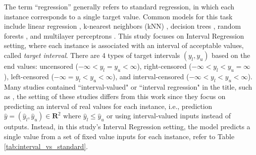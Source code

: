 \documentclass[12pt]{article}
\begin{document}
The term “regression” generally refers to standard regression, in which each instance corresponds to a single target value. Common models for this task include linear regression \citep{linear}, k-nearest neighbors (kNN) \citep{knn}, decision trees \citep{cart}, random forests \citep{rf}, and multilayer perceptrons \citep{uni_approximator}.
This study focuses on Interval Regression setting, where each instance is associated with an interval of acceptable values, called \textit{target interval}.
There are 4 types of target intervals $(y_l, y_u)$ based on the end values: uncensored ($-\infty < y_l = y_u < \infty$), right-censored ($-\infty < y_l < y_u = \infty$), left-censored ($-\infty = y_l < y_u < \infty$), and interval-censored ($-\infty < y_l < y_u < \infty$). 
Many studies contained ``interval-valued" or ``interval regression" in the title, such as \citep{interval_regression_analysis_1, interval_regression_analysis_2, interval_regression_analysis_3, interval_regression_analysis_4, knn_interval, linear_output_interval, linear_input_interval, mlp_input_interval, mlp_interval_input}, the setting of these studies differs from this work since they focus on predicting an interval of real values for each instance, i.e., prediction $\hat{y} = (\hat{y}_l, \hat{y}_u) \in \mathbf{R}^2 \text{ where } \hat{y}_l \leq \hat{y}_u$ or using interval-valued inputs instead of outputs.
Instead, in this study's Interval Regression setting, the model predicts a single value from a set of fixed value inputs for each instance, refer to Table \ref{tab:interval_vs_standard}.
\end{document}
